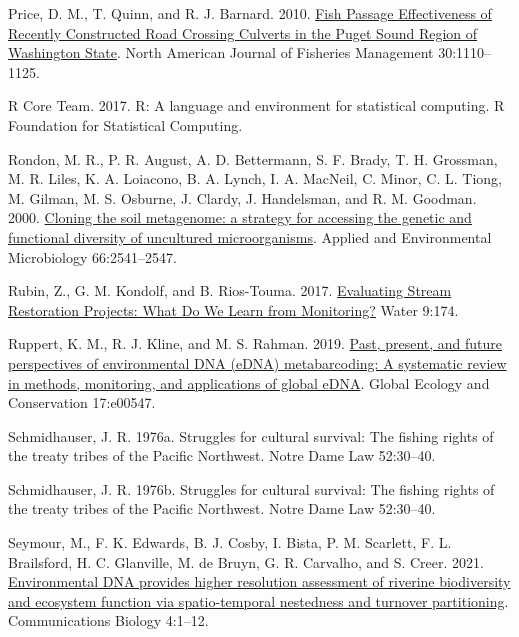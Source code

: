 \documentclass[
]{article}
\newlength{\cslhangindent}
\newlength{\cslentryspacingunit} %
\newenvironment{CSLReferences}[2] %
 {%
  \setlength{\parindent}{0pt}
  \ifodd #1
  \let\oldpar\par
  \def\par{\hangindent=\cslhangindent\oldpar}
  \fi
  \setlength{\parskip}{#2\cslentryspacingunit}
 }%
 {}
\begin{document}
\begin{CSLReferences}{1}{0}
\leavevmode{}%
Price, D. M., T. Quinn, and R. J. Barnard. 2010.
\href{https://doi.org/10.1577/M10-004.1}{Fish Passage Effectiveness of
Recently Constructed Road Crossing Culverts in the Puget Sound Region of
Washington State}. North American Journal of Fisheries Management
30:1110--1125.

\leavevmode{}%
R Core Team. 2017. R: A language and environment for statistical
computing. R Foundation for Statistical Computing.

\leavevmode{}%
Rondon, M. R., P. R. August, A. D. Bettermann, S. F. Brady, T. H.
Grossman, M. R. Liles, K. A. Loiacono, B. A. Lynch, I. A. MacNeil, C.
Minor, C. L. Tiong, M. Gilman, M. S. Osburne, J. Clardy, J. Handelsman,
and R. M. Goodman. 2000.
\href{https://doi.org/10.1128/AEM.66.6.2541-2547.2000}{Cloning the soil
metagenome: a strategy for accessing the genetic and functional
diversity of uncultured microorganisms}. Applied and Environmental
Microbiology 66:2541--2547.

\leavevmode{}%
Rubin, Z., G. M. Kondolf, and B. Rios-Touma. 2017.
\href{https://doi.org/10.3390/w9030174}{Evaluating Stream Restoration
Projects: What Do We Learn from Monitoring?} Water 9:174.

\leavevmode{}%
Ruppert, K. M., R. J. Kline, and M. S. Rahman. 2019.
\href{https://doi.org/10.1016/j.gecco.2019.e00547}{Past, present, and
future perspectives of environmental DNA (eDNA) metabarcoding: A
systematic review in methods, monitoring, and applications of global
eDNA}. Global Ecology and Conservation 17:e00547.

\leavevmode{}%
Schmidhauser, J. R. 1976a. Struggles for cultural survival: The fishing
rights of the treaty tribes of the Pacific Northwest. Notre Dame Law
52:30--40.

\leavevmode{}%
Schmidhauser, J. R. 1976b. Struggles for cultural survival: The fishing
rights of the treaty tribes of the Pacific Northwest. Notre Dame Law
52:30--40.

\leavevmode{}%
Seymour, M., F. K. Edwards, B. J. Cosby, I. Bista, P. M. Scarlett, F. L.
Brailsford, H. C. Glanville, M. de Bruyn, G. R. Carvalho, and S. Creer.
2021. \href{https://doi.org/10.1038/s42003-021-02031-2}{Environmental
DNA provides higher resolution assessment of riverine biodiversity and
ecosystem function via spatio-temporal nestedness and turnover
partitioning}. Communications Biology 4:1--12.


\end{CSLReferences}
\end{document}
